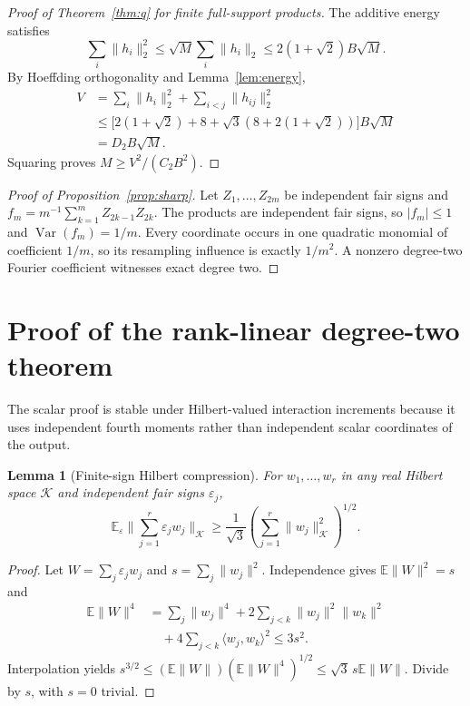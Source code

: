 \documentclass[11pt,letterpaper]{article}
\newtheorem{lemma}[theorem]{Lemma}
\theoremstyle{definition}\newtheorem{definition}[theorem]{Definition}
\newcommand{\E}{\mathbb E}
\newcommand{\Var}{\operatorname{Var}}
\newcommand{\cK}{\mathcal K}
\newcommand{\Ctwo}{C_2}
\newcommand{\abs}[1]{\lvert #1\rvert}
\newcommand{\norm}[1]{\lVert #1\rVert}
\begin{document}
\begin{proof}[Proof of Theorem~\ref{thm:q} for finite full-support products]
The additive energy satisfies
\[\sum_i\norm{h_i}_2^2\le\sqrt M\sum_i\norm{h_i}_2\le2(1+\sqrt2)B\sqrt M.\]
By Hoeffding orthogonality and Lemma~\ref{lem:energy},
\[
\begin{aligned}
V&=\sum_i\norm{h_i}_2^2+\sum_{i<j}\norm{h_{ij}}_2^2\\
&\le\bigl[2(1+\sqrt2)+8+\sqrt3(8+2(1+\sqrt2))\bigr]B\sqrt M\\
&=D_2B\sqrt M.
\end{aligned}
\]
Squaring proves $M\ge V^2/(\Ctwo B^2)$.
\end{proof}

\begin{proof}[Proof of Proposition~\ref{prop:sharp}]
Let $Z_1,\ldots,Z_{2m}$ be independent fair signs and $f_m=m^{-1}\sum_{k=1}^m Z_{2k-1}Z_{2k}$. The products are independent fair signs, so $\abs{f_m}\le1$ and $\Var(f_m)=1/m$. Every coordinate occurs in one quadratic monomial of coefficient $1/m$, so its resampling influence is exactly $1/m^2$. A nonzero degree-two Fourier coefficient witnesses exact degree two.
\end{proof}

\section{Proof of the rank-linear degree-two theorem}\label{sec:rank}
The scalar proof is stable under Hilbert-valued interaction increments because it uses independent fourth moments rather than independent scalar coordinates of the output.

\begin{lemma}[Finite-sign Hilbert compression]\label{lem:sign}
For $w_1,\ldots,w_r$ in any real Hilbert space $\cK$ and independent fair signs $\varepsilon_j$,
\begin{equation}\label{eq:sign}
\E_\varepsilon\norm{\sum_{j=1}^r\varepsilon_jw_j}_{\cK}
\ge\frac{1}{\sqrt3}\left(\sum_{j=1}^r\norm{w_j}_{\cK}^2\right)^{1/2}.
\end{equation}
\end{lemma}
\begin{proof}
Let $W=\sum_j\varepsilon_jw_j$ and $s=\sum_j\norm{w_j}^2$. Independence gives $\E\norm W^2=s$ and
\[\begin{aligned}
\E\norm W^4&=\sum_j\norm{w_j}^4+2\sum_{j<k}\norm{w_j}^2\norm{w_k}^2\\
&\quad+4\sum_{j<k}\langle w_j,w_k\rangle^2\le3s^2.
\end{aligned}\]
Interpolation yields $s^{3/2}\le(\E\norm W)(\E\norm W^4)^{1/2}\le\sqrt3\,s\E\norm W$. Divide by $s$, with $s=0$ trivial.
\end{proof}
\end{document}
